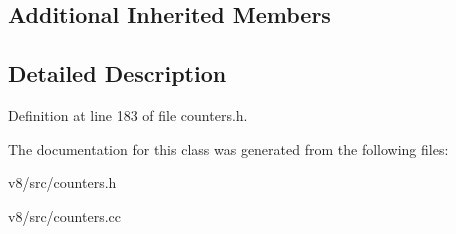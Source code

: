 \subsection*{Additional Inherited Members}


\subsection{Detailed Description}


Definition at line 183 of file counters.\+h.



The documentation for this class was generated from the following files\+:\begin{DoxyCompactItemize}
\item 
v8/src/counters.\+h\item 
v8/src/counters.\+cc\end{DoxyCompactItemize}
